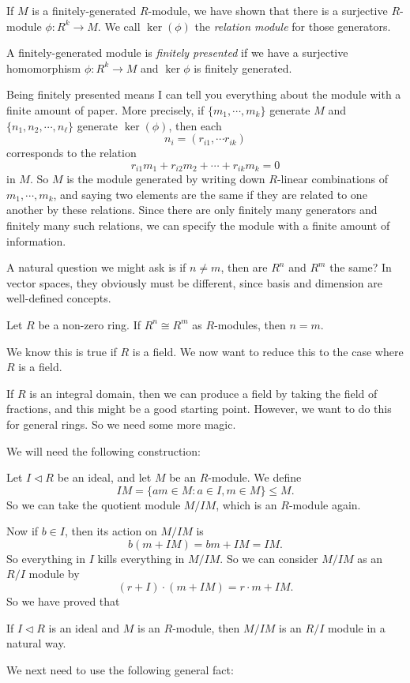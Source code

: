 \documentclass[a4paper]{article}
\begin{document}
\begin{defi}[Relations]
  If $M$ is a finitely-generated $R$-module, we have shown that there is a surjective $R$-module $\phi: R^k \to M$. We call $\ker(\phi)$ the \emph{relation module} for those generators.
\end{defi}

\begin{defi}
  A finitely-generated module is \emph{finitely presented} if we have a surjective homomorphism $\phi: R^k \to M$ and $\ker \phi$ is finitely generated.
\end{defi}

Being finitely presented means I can tell you everything about the module with a finite amount of paper. More precisely, if $\{m_1, \cdots, m_k\}$ generate $M$ and $\{n_1, n_2, \cdots, n_\ell\}$ generate $\ker(\phi)$, then each
\[
  n_i = (r_{i1}, \cdots r_{ik})
\]
corresponds to the relation
\[
  r_{i1}m_1 + r_{i2}m_2 + \cdots + r_{ik}m_k = 0
\]
in $M$. So $M$ is the module generated by writing down $R$-linear combinations of $m_1, \cdots, m_k$, and saying two elements are the same if they are related to one another by these relations. Since there are only finitely many generators and finitely many such relations, we can specify the module with a finite amount of information.

A natural question we might ask is if $n \not= m$, then are $R^n$ and $R^m$ the same? In vector spaces, they obviously must be different, since basis and dimension are well-defined concepts.

\begin{prop}
  Let $R$ be a non-zero ring. If $R^n \cong R^m$ as $R$-modules, then $n = m$.
\end{prop}
We know this is true if $R$ is a field. We now want to reduce this to the case where $R$ is a field.

If $R$ is an integral domain, then we can produce a field by taking the field of fractions, and this might be a good starting point. However, we want to do this for general rings. So we need some more magic.

We will need the following construction:

Let $I \lhd R$ be an ideal, and let $M$ be an $R$-module. We define
\[
  IM = \{a m \in M: a \in I, m \in M\} \leq M.
\]
So we can take the quotient module $M/IM$, which is an $R$-module again.

Now if $b \in I$, then its action on $M/IM$ is
\[
  b (m + IM) = bm + IM = IM.
\]
So everything in $I$ kills everything in $M/IM$. So we can consider $M/IM$ as an $R/I$ module by
\[
  (r + I)\cdot (m + IM) = r\cdot m + IM.
\]
So we have proved that
\begin{prop}
  If $I\lhd R$ is an ideal and $M$ is an $R$-module, then $M/IM$ is an $R/I$ module in a natural way.
\end{prop}
We next need to use the following general fact:
\end{document}
